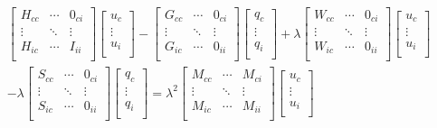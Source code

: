 \documentclass[a4paper,12p]{article}
\begin{document}
	\begin{equation}
	\begin{gathered}
	\begin{bmatrix}
	H_{cc}  & \cdots  & 0_{ci} \\
	\vdots  & \ddots & \vdots \\
	H_{ic} & \cdots & I_{ii} \\
	\end{bmatrix}
	\begin{bmatrix}
	u_{c}\\
	\vdots\\
	u_{i}\\
	\end{bmatrix}
	-
	\begin{bmatrix}
	G_{cc}  & \cdots  & 0_{ci} \\
	\vdots  & \ddots & \vdots \\
	G_{ic} & \cdots & 0_{ii} \\
	\end{bmatrix}
	\begin{bmatrix}
	q_{c}\\
	\vdots\\
	q_{i}\\
	\end{bmatrix}
	+\lambda
	\begin{bmatrix}
	W_{cc}  & \cdots  & 0_{ci} \\
	\vdots  & \ddots & \vdots \\
	W_{ic} & \cdots & 0_{ii} \\
	\end{bmatrix}
	\begin{bmatrix}
	u_{c}\\
	\vdots\\
	u_{i}\\
	\end{bmatrix}
	\\
	-\lambda
	\begin{bmatrix}
	S_{cc}  & \cdots  & 0_{ci} \\
	\vdots  & \ddots & \vdots \\
	S_{ic} & \cdots & 0_{ii} \\
	\end{bmatrix}
	\begin{bmatrix}
	q_{c}\\
	\vdots\\
	q_{i}\\
	\end{bmatrix}
	=
	\lambda^{2}
	\begin{bmatrix}
	M_{cc} & \cdots & M_{ci} \\
	\vdots  & \ddots & \vdots \\
	M_{ic} & \cdots & M_{ii} \\
	\end{bmatrix}
	\begin{bmatrix}
	u_{c}\\
	\vdots\\
	u_{i}\\
	\end{bmatrix}
	\end{gathered}
	\end{equation}
	\\
	
\end{document}
